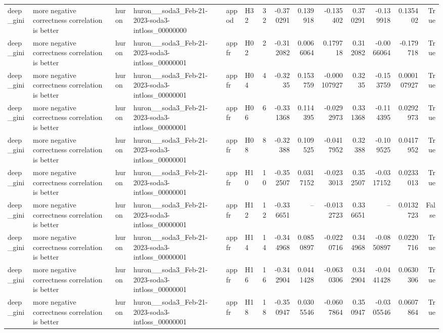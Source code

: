 \begin{longtable}{llllllrrrrrrrr}
deep\_gini & more negative correctness correlation is better & huron & huron\_\_soda3\_Feb-21-2023-soda3-intloss\_00000000 & appod & H32 & 32 & -0.370291 & 0.139918 & -0.135402 & 0.370291 & -0.139918 & 0.135402 & True \\
deep\_gini & more negative correctness correlation is better & huron & huron\_\_soda3\_Feb-21-2023-soda3-intloss\_00000001 & appfr & H02 & 2 & -0.312082 & 0.0066064 & 0.179718 & 0.312082 & -0.0066064 & -0.179718 & True \\
deep\_gini & more negative correctness correlation is better & huron & huron\_\_soda3\_Feb-21-2023-soda3-intloss\_00000001 & appfr & H04 & 4 & -0.3235 & 0.153759 & -0.000107927 & 0.3235 & -0.153759 & 0.000107927 & True \\
deep\_gini & more negative correctness correlation is better & huron & huron\_\_soda3\_Feb-21-2023-soda3-intloss\_00000001 & appfr & H06 & 6 & -0.331368 & 0.114395 & -0.0292973 & 0.331368 & -0.114395 & 0.0292973 & True \\
deep\_gini & more negative correctness correlation is better & huron & huron\_\_soda3\_Feb-21-2023-soda3-intloss\_00000001 & appfr & H08 & 8 & -0.32388 & 0.109525 & -0.0417952 & 0.32388 & -0.109525 & 0.0417952 & True \\
deep\_gini & more negative correctness correlation is better & huron & huron\_\_soda3\_Feb-21-2023-soda3-intloss\_00000001 & appfr & H10 & 10 & -0.352507 & 0.0317152 & -0.0233013 & 0.352507 & -0.0317152 & 0.0233013 & True \\
deep\_gini & more negative correctness correlation is better & huron & huron\_\_soda3\_Feb-21-2023-soda3-intloss\_00000001 & appfr & H12 & 12 & -0.336651 & -- & -0.0132723 & 0.336651 & -- & 0.0132723 & False \\
deep\_gini & more negative correctness correlation is better & huron & huron\_\_soda3\_Feb-21-2023-soda3-intloss\_00000001 & appfr & H14 & 14 & -0.344968 & 0.0850897 & -0.0220716 & 0.344968 & -0.0850897 & 0.0220716 & True \\
deep\_gini & more negative correctness correlation is better & huron & huron\_\_soda3\_Feb-21-2023-soda3-intloss\_00000001 & appfr & H16 & 16 & -0.342904 & 0.0441428 & -0.0630306 & 0.342904 & -0.0441428 & 0.0630306 & True \\
deep\_gini & more negative correctness correlation is better & huron & huron\_\_soda3\_Feb-21-2023-soda3-intloss\_00000001 & appfr & H18 & 18 & -0.350947 & 0.0305546 & -0.0607864 & 0.350947 & -0.0305546 & 0.0607864 & True \\

\end{longtable}
